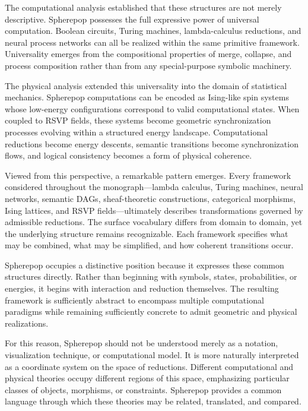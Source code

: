 \documentclass[12pt,letterpaper]{article}
\theoremstyle{remark}
\begin{document}
The computational analysis established that these structures are not merely descriptive. Spherepop possesses the full expressive power of universal computation. Boolean circuits, Turing machines, lambda-calculus reductions, and neural process networks can all be realized within the same primitive framework. Universality emerges from the compositional properties of merge, collapse, and process composition rather than from any special-purpose symbolic machinery.

The physical analysis extended this universality into the domain of statistical mechanics. Spherepop computations can be encoded as Ising-like spin systems whose low-energy configurations correspond to valid computational states. When coupled to RSVP fields, these systems become geometric synchronization processes evolving within a structured energy landscape. Computational reductions become energy descents, semantic transitions become synchronization flows, and logical consistency becomes a form of physical coherence.

Viewed from this perspective, a remarkable pattern emerges. Every framework considered throughout the monograph—lambda calculus, Turing machines, neural networks, semantic DAGs, sheaf-theoretic constructions, categorical morphisms, Ising lattices, and RSVP fields—ultimately describes transformations governed by admissible reductions. The surface vocabulary differs from domain to domain, yet the underlying structure remains recognizable. Each framework specifies what may be combined, what may be simplified, and how coherent transitions occur.

Spherepop occupies a distinctive position because it expresses these common structures directly. Rather than beginning with symbols, states, probabilities, or energies, it begins with interaction and reduction themselves. The resulting framework is sufficiently abstract to encompass multiple computational paradigms while remaining sufficiently concrete to admit geometric and physical realizations.

For this reason, Spherepop should not be understood merely as a notation, visualization technique, or computational model. It is more naturally interpreted as a coordinate system on the space of reductions. Different computational and physical theories occupy different regions of this space, emphasizing particular classes of objects, morphisms, or constraints. Spherepop provides a common language through which these theories may be related, translated, and compared.
\end{document}
